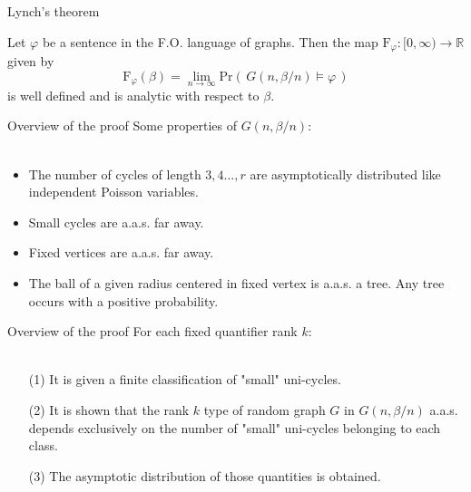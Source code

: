 \documentclass[11pt]{beamer}
\newcommand{\R}{\mathbb{R}}
\newcommand{\Ln}{\lim\limits_{n\to \infty}}
\begin{document}
	\begin{frame}{Lynch's theorem}
	\begin{theorem}[Lynch, 1992]
		Let $\varphi$ be a sentence in the F.O. language of graphs. 
		Then the map $\mathrm{F}_\varphi: [0,\infty) \rightarrow \R$ given by 
		\[\mathrm{F}_\varphi(\beta)=\Ln \mathrm{Pr}(\, G(n,\beta/n)\models \varphi \,) \]
		is well defined and is analytic with respect to $\beta$.
	\end{theorem}
	\end{frame}
	
	\begin{frame}{Overview of the proof}
	Some properties of $G(n,\beta/n)$:
	\\~\\
	\begin{itemize}
		\item The number of cycles of 
		length $3,4\dots, r$
		are asymptotically distributed like independent Poisson 
		variables.
		\vspace{0.5em}
		\item Small cycles are a.a.s. far away.
		\vspace{0.5em}
		\item Fixed vertices are a.a.s. far away.
		\vspace{0.5em}
		\item The ball of a given radius centered in fixed
		vertex is a.a.s. a tree. Any tree occurs with a positive 
		probability.
	\end{itemize}
	
	\end{frame}

	\begin{frame}{Overview of the proof}
	For each fixed quantifier rank $k$:
	\\~\\
		\begin{itemize}
			\item[(1)]	It is given a finite classification of "small" uni-cycles.
			\vspace{0.5em}
			\item[(2)]  It is shown that the rank $k$ type of random graph $G$
			 in $G(n,\beta/n)$ a.a.s. depends exclusively on the number of "small" uni-cycles
			 belonging to each class. 
			\vspace{0.5em}
			\item[(3)] The asymptotic distribution of those quantities is obtained. 
		\end{itemize}
	\end{frame}
\end{document}
